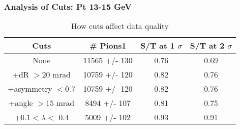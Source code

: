 \frame
{
\frametitle{Analysis of Cuts: Pt 13-15 GeV}
\begin{table}
\caption{How cuts affect data quality}
\centering
\begin{tabular}{c c c c}
\hline\hline
Cuts & \# Pions1 & S/T at 1 $\sigma$ & S/T at 2 $\sigma$ \\ [0.5ex]
\hline
None & 11565 +/-  130 & 0.76 & 0.69 \\ %
+dR $> 20$ mrad & 10759 +/-  120 & 0.82 & 0.76 \\ %
+asymmetry $< 0.7$ & 10759 +/-  120 & 0.82 & 0.76 \\ %
+angle $> 15$ mrad & 8494 +/-  107 & 0.81 & 0.75 \\ %
+$0.1 < \lambda <$ 0.4 & 5009 +/-  102 & 0.93 & 0.91 \\ %
[1ex]
\hline
\end{tabular}
\label{table:nonlin}
\end{table}
}
